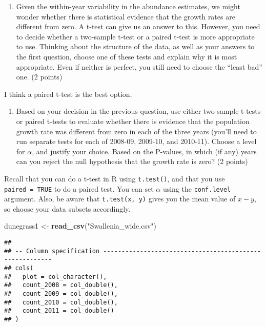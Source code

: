 \documentclass[
]{article}
\newenvironment{Shaded}{\begin{snugshade}}{\end{snugshade}}
\newcommand{\KeywordTok}[1]{\textcolor[rgb]{0.13,0.29,0.53}{\textbf{#1}}}
\newcommand{\NormalTok}[1]{#1}
\newcommand{\StringTok}[1]{\textcolor[rgb]{0.31,0.60,0.02}{#1}}
\providecommand{\tightlist}{%
  \setlength{\itemsep}{0pt}\setlength{\parskip}{0pt}}
\begin{document}
\begin{enumerate}
\def\labelenumi{\arabic{enumi}.}
\setcounter{enumi}{3}
\tightlist
\item
  Given the within-year variability in the abundance estimates, we might
  wonder whether there is statistical evidence that the growth rates are
  different from zero. A t-test can give us an answer to this. However,
  you need to decide whether a two-sample t-test or a paired t-test is
  more appropriate to use. Thinking about the structure of the data, as
  well as your answers to the first question, choose one of these tests
  and explain why it is most appropriate. Even if neither is perfect,
  you still need to choose the ``least bad'' one. (2 points)
\end{enumerate}

I think a paired t-test is the best option.

\begin{enumerate}
\def\labelenumi{\arabic{enumi}.}
\setcounter{enumi}{4}
\tightlist
\item
  Based on your decision in the previous question, use either two-sample
  t-tests or paired t-tests to evaluate whether there is evidence that
  the population growth rate was different from zero in each of the
  three years (you'll need to run separate tests for each of 2008-09,
  2009-10, and 2010-11). Choose a level for \(\alpha\), and justify your
  choice. Based on the P-values, in which (if any) years can you reject
  the null hypothesis that the growth rate is zero? (2 points)
\end{enumerate}

Recall that you can do a t-test in R using \texttt{t.test()}, and that
you use \texttt{paired\ =\ TRUE} to do a paired test. You can set
\(\alpha\) using the \texttt{conf.level} argument. Also, be aware that
\texttt{t.test(x,\ y)} gives you the mean value of \(x - y\), so choose
your data subsets accordingly.

\begin{Shaded}
\begin{Highlighting}[]
\NormalTok{dunegrass1 <-}\StringTok{ }\KeywordTok{read_csv}\NormalTok{(}\StringTok{"Swallenia_wide.csv"}\NormalTok{)}
\end{Highlighting}
\end{Shaded}

\begin{verbatim}
## 
## -- Column specification --------------------------------------------------------
## cols(
##   plot = col_character(),
##   count_2008 = col_double(),
##   count_2009 = col_double(),
##   count_2010 = col_double(),
##   count_2011 = col_double()
## )
\end{verbatim}
\end{document}
